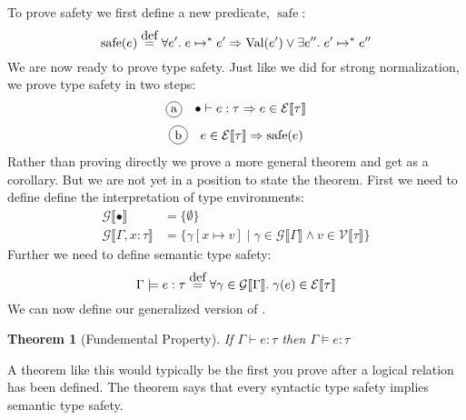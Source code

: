 \documentclass[a4paper,10pt,fleqn]{article}
\newcommand{\sem}[1]{\ensuremath{\llbracket #1 \rrbracket}}
\newcommand{\curly}[1]{\ensuremath{\mathcal{#1}}}
\DeclareMathOperator{\safe}{safe}
\DeclareMathOperator{\val}{Val}
\newcommand{\evalto}{\ensuremath{\mapsto}}
\newcommand{\evaltos}{\ensuremath{\evalto^*}}
\newcommand{\mtenv}{\ensuremath{\bullet}}
\newcommand{\eqdef}{\ensuremath{ \; \stackrel{\mathclap{\normalfont\mbox{def}}}{=} \;}}
\newcommand{\vbar}{\ensuremath{\; | \;}}
\newcommand{\epred}[1]{\ensuremath{\curly{E}\sem{#1}}}
\newcommand{\vpred}[1]{\ensuremath{\curly{V}\sem{#1}}}
\newcommand{\gpred}[1]{\ensuremath{\curly{G}\sem{#1}}}
\newcommand*{\circled}[1]{\tikz[baseline=(char.base)]{
            \node[shape=circle,draw,inner sep=2pt] (char) {#1};}}
\newtheorem*{btypesafety}{Theorem}
\begin{document}
To prove safety we first define a new predicate, $\safe$:
\[
  \safe(e) \eqdef \forall e' . \; e \evaltos e' \Rightarrow \val(e') \vee \exists e
''. \; e' \evaltos e''
\]
We are now ready to prove type safety. Just like we did for strong normalization, we prove type safety in two steps:
\[
  \circled{a} \quad \mtenv \vdash e : \tau \Rightarrow e \in \epred{\tau}
\]
\[
  \circled{b} \quad e \in \epred{\tau} \Rightarrow \safe(e)
\]
Rather than proving \circled{a} directly we prove a more general theorem and get \circled{a} as a corollary. But we are not yet in a position to state the theorem. First we need to define define the interpretation of type environments:
\begin{align*}
  \gpred{\bullet} & = \{ \emptyset \} \\
  \gpred{\Gamma,x:\tau} & = \{\gamma[x \mapsto v] \vbar \gamma \in \gpred{\Gamma} \wedge v \in \vpred{\tau}\}
\end{align*}
Further we need to define semantic type safety:
\[
  \Gamma \models e : \tau \eqdef \forall \gamma \in \gpred{\Gamma} . \; \gamma(e) \in \epred{\tau}
\]
We can now define our generalized version of \circled{a}. 
\begin{btypesafety}[Fundemental Property]
  If $\Gamma \vdash e : \tau$ then $\Gamma \models e : \tau$
\end{btypesafety}
A theorem like this would typically be the first you prove after a logical relation has been defined. The theorem says that every syntactic type safety implies semantic type safety. 
\end{document}
